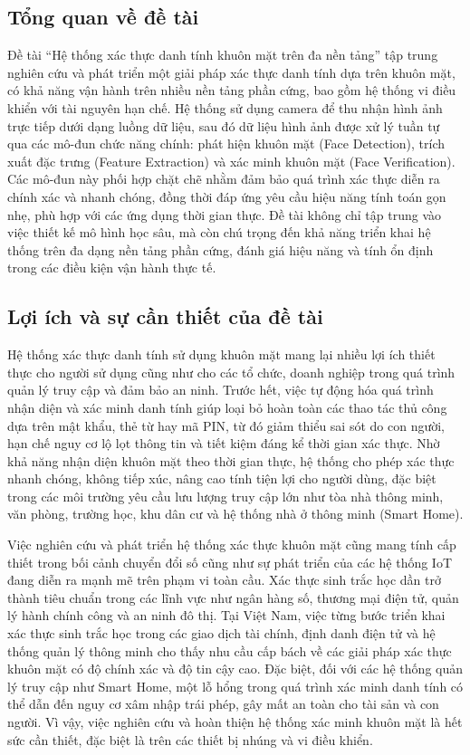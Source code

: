 \subsection{Tổng quan về đề tài}
Đề tài “Hệ thống xác thực danh tính khuôn mặt trên đa nền tảng” tập trung nghiên cứu và phát triển một giải pháp xác thực danh tính dựa trên khuôn mặt, có khả năng vận hành trên nhiều nền tảng phần cứng, bao gồm hệ thống vi điều khiển với tài nguyên hạn chế. Hệ thống sử dụng camera để thu nhận hình ảnh trực tiếp dưới dạng luồng dữ liệu, sau đó dữ liệu hình ảnh được xử lý tuần tự qua các mô-đun chức năng chính: phát hiện khuôn mặt (Face Detection), trích xuất đặc trưng (Feature Extraction) và xác minh khuôn mặt (Face Verification). Các mô-đun này phối hợp chặt chẽ nhằm đảm bảo quá trình xác thực diễn ra chính xác và nhanh chóng, đồng thời đáp ứng yêu cầu hiệu năng tính toán gọn nhẹ, phù hợp với các ứng dụng thời gian thực. Đề tài không chỉ tập trung vào việc thiết kế mô hình học sâu, mà còn chú trọng đến khả năng triển khai hệ thống trên đa dạng nền tảng phần cứng, đánh giá hiệu năng và tính ổn định trong các điều kiện vận hành thực tế.

\subsection{Lợi ích và sự cần thiết của đề tài}
Hệ thống xác thực danh tính sử dụng khuôn mặt mang lại nhiều lợi ích thiết thực cho người sử dụng cũng như cho các tổ chức, doanh nghiệp trong quá trình quản lý truy cập và đảm bảo an ninh. Trước hết, việc tự động hóa quá trình nhận diện và xác minh danh tính giúp loại bỏ hoàn toàn các thao tác thủ công dựa trên mật khẩu, thẻ từ hay mã PIN, từ đó giảm thiểu sai sót do con người, hạn chế nguy cơ lộ lọt thông tin và tiết kiệm đáng kể thời gian xác thực\cite{ibm_2025_biometric}. Nhờ khả năng nhận diện khuôn mặt theo thời gian thực, hệ thống cho phép xác thực nhanh chóng, không tiếp xúc, nâng cao tính tiện lợi cho người dùng, đặc biệt trong các môi trường yêu cầu lưu lượng truy cập lớn như tòa nhà thông minh, văn phòng, trường học, khu dân cư và hệ thống nhà ở thông minh (Smart Home).

Việc nghiên cứu và phát triển hệ thống xác thực khuôn mặt cũng mang tính cấp thiết trong bối cảnh chuyển đổi số cũng như sự phát triển của các hệ thống IoT đang diễn ra mạnh mẽ trên phạm vi toàn cầu. Xác thực sinh trắc học dần trở thành tiêu chuẩn trong các lĩnh vực như ngân hàng số, thương mại điện tử, quản lý hành chính công và an ninh đô thị. Tại Việt Nam, việc từng bước triển khai xác thực sinh trắc học trong các giao dịch tài chính, định danh điện tử và hệ thống quản lý thông minh cho thấy nhu cầu cấp bách về các giải pháp xác thực khuôn mặt có độ chính xác và độ tin cậy cao. Đặc biệt, đối với các hệ thống quản lý truy cập như Smart Home, một lỗ hổng trong quá trình xác minh danh tính có thể dẫn đến nguy cơ xâm nhập trái phép, gây mất an toàn cho tài sản và con người. Vì vậy, việc nghiên cứu và hoàn thiện hệ thống xác minh khuôn mặt là hết sức cần thiết, đặc biệt là trên các thiết bị nhúng và vi điều khiển.

